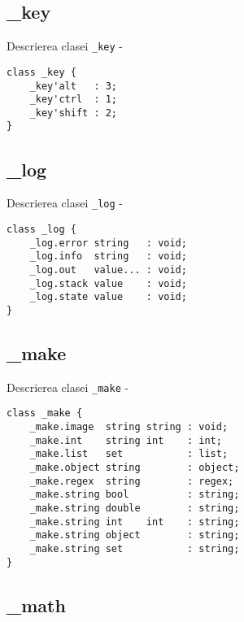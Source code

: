 \subsection{{\color{orange} \_key}}

\noindent Descrierea clasei \texttt{\_key} -
\begin{verbatim}
class _key {
	_key'alt   : 3;
	_key'ctrl  : 1;
	_key'shift : 2;
}
\end{verbatim}

\subsection{{\color{orange} \_log}}

\noindent Descrierea clasei \texttt{\_log} -
\begin{verbatim}
class _log {
	_log.error string   : void;
	_log.info  string   : void;
	_log.out   value... : void;
	_log.stack value    : void;
	_log.state value    : void;
}
\end{verbatim}

\subsection{{\color{orange} \_make}}

\noindent Descrierea clasei \texttt{\_make} -
\begin{verbatim}
class _make {
	_make.image  string string : void;
	_make.int    string int    : int;
	_make.list   set           : list;
	_make.object string        : object;
	_make.regex  string        : regex;
	_make.string bool          : string;
	_make.string double        : string;
	_make.string int    int    : string;
	_make.string object        : string;
	_make.string set           : string;
}
\end{verbatim}

\subsection{{\color{orange} \_math}}

